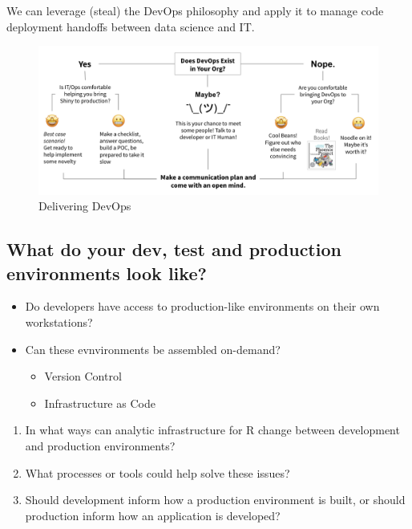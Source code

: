 \documentclass[]{book}
\providecommand{\tightlist}{%
  \setlength{\itemsep}{0pt}\setlength{\parskip}{0pt}}
\theoremstyle{definition}
\theoremstyle{definition}
\theoremstyle{definition}
\theoremstyle{remark}
\begin{document}
We can leverage (steal) the DevOps philosophy and apply it to manage
code deployment handoffs between data science and IT.

\begin{figure}
\centering
\includegraphics{imgs/devops/devops-flowchart.png}
\caption{Delivering DevOps}
\end{figure}

\hypertarget{what-do-your-dev-test-and-production-environments-look-like}{%
\subsection{What do your dev, test and production environments look
like?}\label{what-do-your-dev-test-and-production-environments-look-like}}

\begin{itemize}
\tightlist
\item
  Do developers have access to production-like environments on their own
  workstations?
\item
  Can these evnvironments be assembled on-demand?

  \begin{itemize}
  \tightlist
  \item
    Version Control
  \item
    Infrastructure as Code
  \end{itemize}
\end{itemize}

\begin{enumerate}
\def\labelenumi{\arabic{enumi}.}
\tightlist
\item
  In what ways can analytic infrastructure for R change between
  development and production environments?
\item
  What processes or tools could help solve these issues?
\item
  Should development inform how a production environment is built, or
  should production inform how an application is developed?
\end{enumerate}
\end{document}
